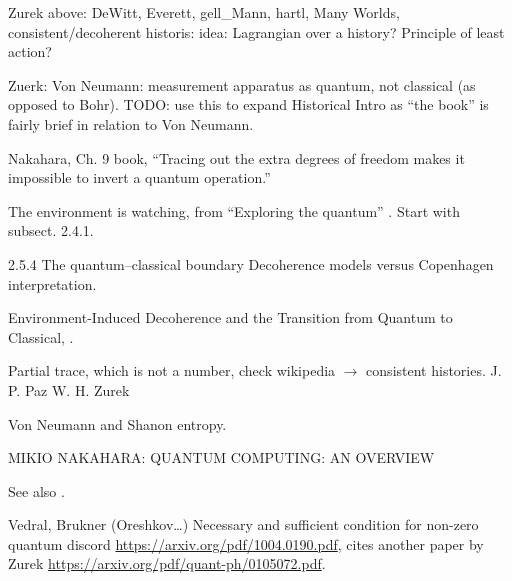 Zurek above: DeWitt, Everett, gell_Mann, hartl, Many Worlds, consistent/decoherent historis:
idea: Lagrangian over a history? Principle of least action?

Zuerk: Von Neumann: measurement apparatus as quantum, not classical (as opposed to Bohr).
TODO: use this to expand Historical Intro as ``the book'' is fairly brief in relation to
Von Neumann.

Nakahara, Ch. 9 book, ``Tracing out the extra degrees of freedom makes it impossible to invert a quantum operation.''

The environment is watching, from ``Exploring the quantum''
\parencite[Ch. 4]{Haroche_Exploring}. Start with subsect. 2.4.1.

2.5.4 The quantum–classical boundary
Decoherence models versus Copenhagen interpretation.

Environment-Induced Decoherence and the Transition from Quantum to Classical,
\cite{Zurek_Fundamentals}.

Partial trace, which is not a number, check wikipedia $\rightarrow$ consistent histories.
J. P. Paz W. H. Zurek

Von Neumann and Shanon entropy.

MIKIO NAKAHARA: QUANTUM COMPUTING: AN OVERVIEW

See also \cite{Schlosshauer_Decoherence}.

Vedral, Brukner (Oreshkov\dots)
Necessary and sufficient condition for non-zero quantum discord
\url{https://arxiv.org/pdf/1004.0190.pdf},
cites another paper by Zurek \url{https://arxiv.org/pdf/quant-ph/0105072.pdf}.
